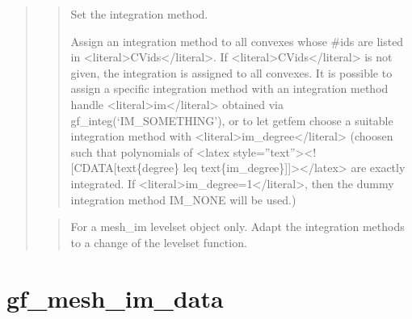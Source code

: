 \documentclass[a4paper,11pt,english]{sphinxmanual}
\begin{document}
\sphinxAtStartPar
{}
\begin{quote}

\sphinxAtStartPar
{}
\begin{quote}

\sphinxAtStartPar
Set the integration method.

\sphinxAtStartPar
Assign an integration method to all convexes whose \#ids are
listed in \textless{}literal\textgreater{}CVids\textless{}/literal\textgreater{}. If \textless{}literal\textgreater{}CVids\textless{}/literal\textgreater{} is not given, the integration is
assigned to all convexes. It is possible to assign a specific
integration method with an integration method handle \textless{}literal\textgreater{}im\textless{}/literal\textgreater{} obtained
via gf\_integ(‘IM\_SOMETHING’), or to let getfem choose a suitable
integration method with \textless{}literal\textgreater{}im\_degree\textless{}/literal\textgreater{} (choosen such that polynomials
of \textless{}latex style=”text”\textgreater{}\textless{}!{[}CDATA{[}text\{degree\} leq text\{im\_degree\}{]}{]}\textgreater{}\textless{}/latex\textgreater{} are exactly integrated.
If \textless{}literal\textgreater{}im\_degree=\sphinxhyphen{}1\textless{}/literal\textgreater{}, then the dummy integration method IM\_NONE will
be used.)
\end{quote}

\sphinxAtStartPar
{}
\begin{quote}

\sphinxAtStartPar
For a mesh\_im levelset object only. Adapt the integration methods to a
change of the levelset function.
\end{quote}
\end{quote}


\section{gf\_mesh\_im\_data}
\label{\detokenize{scilab/cmdref_gf_mesh_im_data:gf-mesh-im-data}}\label{\detokenize{scilab/cmdref_gf_mesh_im_data::doc}}
\sphinxAtStartPar
{}

\begin{sphinxVerbatim}[commandchars=\\\{\}]
       
\end{sphinxVerbatim}
\end{document}
